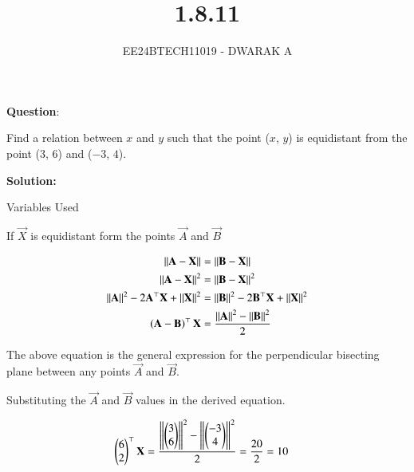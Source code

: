 \documentclass[journal]{IEEEtran}
\begin{document}

\vspace{3cm}

\title{1.8.11}
\author{EE24BTECH11019 - DWARAK A}
{\let\newpage\relax\maketitle}

\renewcommand{\thefigure}{\theenumi}
\renewcommand{\thetable}{\theenumi}
\setlength{\intextsep}{10pt} %


\renewcommand{\thetable}{\theenumi}


\textbf{Question}:

Find a relation between $x$ and $y$ such that the point ($x$, $y$) is equidistant from the point ($3$, $6$) and ($-3$, $4$).

\textbf{Solution: }
\begin{table}[h!]    
  \centering
  
  \caption{Variables Used}
  \label{tab1.8.11.1}
\end{table}

If $\vec{X}$ is equidistant form the points $\vec{A}$ and $\vec{B}$

\begin{align}
	\left\lVert\mathbf{A}-\mathbf{X}\right\rVert&=\left\lVert\mathbf{B}-\mathbf{X}\right\rVert\\
	\left\lVert\mathbf{A}-\mathbf{X}\right\rVert^2&=\left\lVert\mathbf{B}-\mathbf{X}\right\rVert^2\\
	\left\lVert\mathbf{A}\right\rVert^2-2\mathbf{A}^\top\mathbf{X}+\left\lVert\mathbf{X}\right\rVert^2&=\left\lVert\mathbf{B}\right\rVert^2-2\mathbf{B}^\top\mathbf{X}+\left\lVert\mathbf{X}\right\rVert^2\\
	\left(\mathbf{A}-\mathbf{B}\right)^\top\mathbf{X}&=\frac{\left\lVert\mathbf{A}\right\rVert^2-\left\lVert\mathbf{B}\right\rVert^2}{2}
\end{align}

The above equation is the general expression for the perpendicular bisecting plane between any points $\vec{A}$ and $\vec{B}$.

Substituting the $\vec{A}$ and $\vec{B}$ values in the derived equation.

\begin{align}
	\begin{pmatrix}6 \\ 2\end{pmatrix}^\top\mathbf{X} &= \frac{\left\lVert\begin{pmatrix}3 \\ 6\end{pmatrix}\right\rVert^2-\left\lVert\begin{pmatrix}-3 \\ 4\end{pmatrix}\right\rVert^2}{2}=\frac{20}{2}=10
\end{align}
\end{document}
